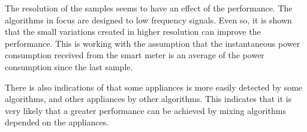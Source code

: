 The resolution of the samples seems to have an effect of the performance. The algorithms in focus are designed to low frequency signals. Even so, it is shown that the small variations created in higher resolution can improve the performance. This is working with the assumption that the instantaneous power consumption received from the smart meter is an average of the power consumption since the last sample. 

There is also indications of that some appliances is more easily detected by some algorithms, and other appliances by other algorithms. This indicates that it is very likely that a greater performance can be achieved by mixing algorithms depended on the appliances.